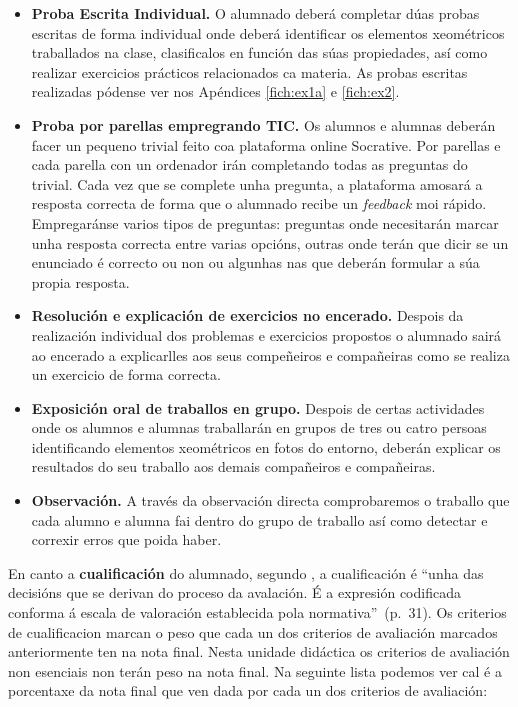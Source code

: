 \begin{itemize}
    \item \textbf{Proba Escrita Individual.} O alumnado deberá completar dúas probas escritas de forma individual onde deberá identificar os elementos xeométricos traballados na clase, clasificalos en función das súas propiedades, así como realizar exercicios prácticos relacionados ca materia. As probas escritas realizadas pódense ver nos Apéndices \ref{fich:ex1a} e \ref{fich:ex2}.
    \item \textbf{Proba por parellas empregrando TIC.} Os alumnos e alumnas deberán facer un pequeno trivial feito coa plataforma online Socrative. Por parellas e cada parella con un ordenador irán completando todas as preguntas do trivial. Cada vez que se complete unha pregunta, a plataforma amosará a resposta correcta de forma que o alumnado recibe un \emph{feedback} moi rápido. Empregaránse varios tipos de preguntas: preguntas onde necesitarán marcar unha resposta correcta entre varias opcións, outras onde terán que dicir se un enunciado é correcto ou non ou algunhas nas que deberán formular a súa propia resposta.
    \item \textbf{Resolución e explicación de exercicios no encerado.} Despois da realización individual dos problemas e exercicios propostos o alumnado sairá ao encerado a explicarlles aos seus compeñeiros e compañeiras como se realiza un exercicio de forma correcta.
    \item \textbf{Exposición oral de traballos en grupo.} Despois de certas actividades onde os alumnos e alumnas traballarán en grupos de tres ou catro persoas identificando elementos xeométricos en fotos do entorno, deberán explicar os resultados do seu traballo aos demais compañeiros e compañeiras.
    \item \textbf{Observación.} A través da observación directa comprobaremos o traballo que cada alumno e alumna fai dentro do grupo de traballo así como detectar e correxir erros que poida haber.
\end{itemize}

En canto a \textbf{cualificación} do alumnado, segundo , a cualificación é ``unha das decisións que se derivan do proceso da avalación. É a expresión codificada conforma á escala de valoración establecida pola normativa''~(p.~31). Os criterios de cualificacion marcan o peso que cada un dos criterios de avaliación marcados anteriormente ten na nota final. Nesta unidade didáctica os criterios de avaliación non esenciais non terán peso na nota final. Na seguinte lista podemos ver cal é a porcentaxe da nota final que ven dada por cada un dos criterios de avaliación:

